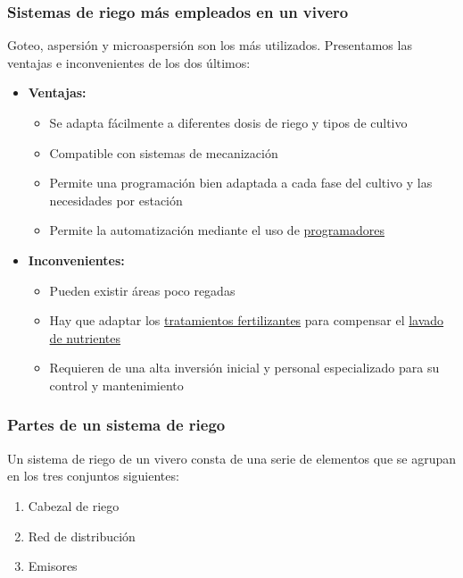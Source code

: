 \documentclass[a4paper,12pt,oneside]{article}
\begin{document}
\subsubsection{Sistemas de riego más empleados en un vivero}
\label{sec:org4b255cf}
Goteo, aspersión y microaspersión son los más utilizados. Presentamos las
ventajas e inconvenientes de los dos últimos:\\
\begin{itemize}
\item \textbf{Ventajas:}\\
\begin{itemize}
\item Se adapta fácilmente a diferentes dosis de riego y tipos de cultivo
\item Compatible con sistemas de mecanización
\item Permite una programación bien adaptada a cada fase del cultivo y las
necesidades por estación
\item Permite la automatización mediante el uso de \uline{programadores}
\end{itemize}
\item \textbf{Inconvenientes:}\\
\begin{itemize}
\item Pueden existir áreas poco regadas
\item Hay que adaptar los \uline{tratamientos fertilizantes}  para compensar el \uline{lavado
de nutrientes}
\item Requieren de una alta inversión inicial y personal especializado para su
control y mantenimiento
\end{itemize}
\end{itemize}
\subsubsection{Partes de un sistema de riego}
\label{sec:orged815f4}
Un sistema de riego de un vivero consta de una serie de elementos que se agrupan
en los tres conjuntos siguientes:\\
\begin{enumerate}
\item Cabezal de riego
\item Red de distribución
\item Emisores
\end{enumerate}
\end{document}
